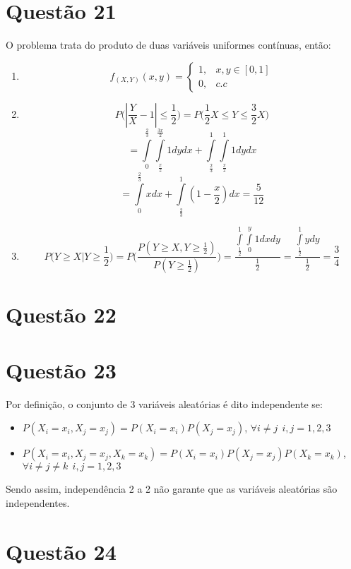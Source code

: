\documentclass[a4paper,12pt]{report}
\begin{document}
			\section*{Questão 21}
			O problema trata do produto de duas variáveis uniformes contínuas, então:
					\begin{enumerate}[label=\alph*)]
						\item 
			$$f_(X,Y)(x,y)=\begin{cases}
			1, & x,y \in [0,1]\\
			0, & c.c
			\end{cases} $$
			\item $$P\bigg(|\frac{Y}{X}-1| \le \frac{1}{2}\bigg)  = 
			P\bigg(\frac{1}{2} X \le Y \le \frac{3}{2} X  \bigg)$$
			$$= \int\limits_{0}^{\frac{2}{3}}\int\limits_{\frac{x}{2}}^{\frac{3x}{2}}1 dydx +   
			\int\limits_{\frac{2}{3}}^{1}\int\limits_{\frac{x}{2}}^{1}1 dydx
			$$
			$$ 
=	\int\limits_{0}^{\frac{2}{3}}x dx +   
	\int\limits_{\frac{2}{3}}^{1}(1-\frac{x}{2}) dx = \frac{5}{12}
			$$
			\item $$P\bigg(Y\ge X| Y \ge \frac{1}{2}\bigg)  = P\bigg(
			\frac{P(Y\ge X, Y\ge \frac{1}{2})}{P(Y\ge \frac{1}{2})}
			\bigg)
			=
			\frac{\int\limits_{\frac{1}{2}}^1\int\limits_0^y 1 dxdy}{\frac{1}{2}} = 
				\frac{\int\limits_{\frac{1}{2}}^1 y dy}{\frac{1}{2}} = \frac{3}{4}
			$$
			\end{enumerate}
	 		\section*{Questão 22}

	\section*{Questão 23}
	
	Por definição, o conjunto de 3 variáveis aleatórias é dito independente se:
	
	\begin{itemize}
		 \item $P(X_i=x_i,X_j=x_j) = P(X_i=x_i)P(X_j=x_j)$, $\forall i\ne j  \ \ i,j=1,2,3$	
		 		 \item $P(X_i=x_i,X_j=x_j,X_k=x_k) = P(X_i=x_i)P(X_j=x_j)P(X_k=x_k)$, $\forall i\ne j \ne k\ \ i,j=1,2,3$	
	
	\end{itemize} 
Sendo assim, independência 2 a 2 não garante que as variáveis aleatórias são independentes.
\newpage 
	\section*{Questão 24}
	
\end{document}
